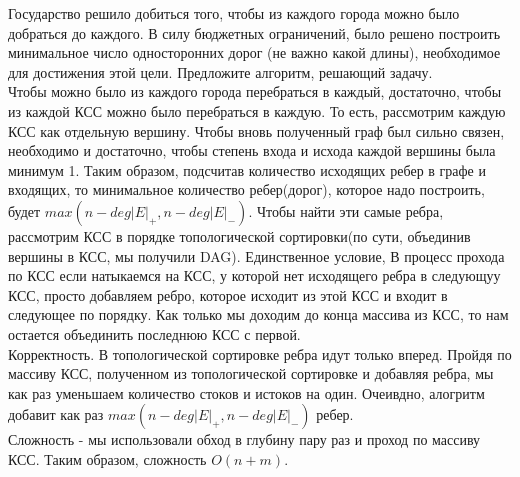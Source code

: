 \documentclass[12pt]{extreport}
\theoremstyle{definiton}
\theoremstyle{definition}
\theoremstyle{definition}
\newcounter{problem}
\newcounter{subrproblem}
\def\prsubstar{\medskip\noindent\stepcounter{subrproblem}{\rm $\thesubrproblem^*$\negthickspace.}\;}
\begin{document}
	\prsubstar Государство решило добиться того, чтобы из каждого города можно было добраться до каждого. В силу бюджетных ограничений, было решено  построить минимальное число односторонних дорог (не важно какой длины), необходимое для достижения этой цели. Предложите алгоритм, решающий задачу.
	\newline
	\\ Чтобы можно было из каждого города перебраться в каждый, достаточно, чтобы из каждой КСС можно было перебраться в каждую. То есть, рассмотрим каждую КСС как отдельную вершину. Чтобы вновь полученный граф был сильно связен, необходимо и достаточно, чтобы степень входа и исхода каждой вершины была минимум 1. Таким образом, подсчитав количество исходящих ребер в графе и входящих, то минимальное количество ребер(дорог), которое надо построить, будет $max(n-deg|E|_+, n-deg|E|_-)$. Чтобы найти эти самые ребра, рассмотрим КСС в порядке топологической сортировки(по сути, объединив вершины в КСС, мы получили DAG). Единственное условие, В процесс прохода по КСС если натыкаемся на КСС, у которой нет исходящего ребра в следующуу КСС, просто добавляем ребро, которое исходит из этой КСС и входит в следующее по порядку. Как только мы доходим до конца массива из КСС, то нам остается объединить последнюю КСС с первой.
	\\Корректность. В топологической сортировке ребра идут только вперед. Пройдя по массиву КСС, полученном из топологической сортировке и добавляя ребра, мы как раз уменьшаем количество стоков и истоков на один. Очеивдно, алогритм добавит как раз $max(n-deg|E|_+, n-deg|E|_-)$ ребер.
	\\Сложность - мы использовали обход в глубину пару раз и проход по массиву КСС. Таким образом, сложность $O(n+m)$.
\end{document}
